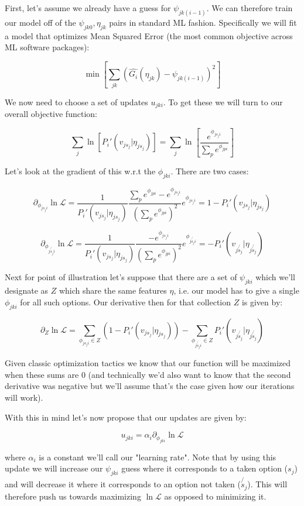 \documentclass[11pt]{article}
\begin{document}
First, let's assume we already have a guess for $\psi_{jk(i-1)}$. We can therefore train our model off of the $\psi_{jk0},\eta_{jk}$ pairs in standard ML fashion. Specifically we will fit a model that optimizes Mean Squared Error (the most common objective across ML software packages):

$$\min{\left[ \sum_{jk}\left(\hat{G_i}(\eta_{jk}) - \psi_{jk(i-1)}\right)^2 \right]}$$

We now need to choose a set of updates $u_{jki}$. To get these we will turn to our overall objective function:

$$\sum_j \ln{\left[ P_i'(v_{js_j} | \eta_{js_j}) \right]}= \sum_j \ln{\left[ \frac{e^{\phi_{js_ji}}}{\sum_p e^{\phi_{jpi}}} \right]}$$

Let's look at the gradient of this w.r.t the $\phi_{jki}$. There are two cases:

$$\partial_{\phi_{js_ji}}\ln{\mathcal{L}}
=
\frac{1}{P_i'(v_{js_j} | \eta_{js_j})}\frac{\sum_p e^{\phi_{jpi}}-e^{\phi_{js_ji}}}{\left( \sum_p e^{\phi_{jpi}} \right)^2} e^{\phi_{js_ji}}
=
1-P_i'(v_{js_j} | \eta_{js_j}) $$ 

$$\partial_{\phi_{j\not{s_j}i}}\ln{\mathcal{L}}
=
\frac{1}{P_i'(v_{js_j} | \eta_{js_j})}\frac{-e^{\phi_{js_ji}}}{\left( \sum_p e^{\phi_{jpi}} \right)^2} e^{\phi_{j\not{s_j}i}}
= 
-P_i'(v_{j\not{s_j}} | \eta_{j\not{s_j}})$$ 

Next for point of illustration let's suppose that there are a set of $\psi_{jki}$ which we'll designate as $Z$ which share the same features $\eta$, i.e. our model has to give a single $\phi_{jki}$ for all such options. Our derivative then for that collection $Z$ is given by:

$$\partial_Z \ln{\mathcal{L}}=\sum_{\phi_{js_ji} \in Z}\left(1-P_i'(v_{js_j} | \eta_{js_j}) \right)-\sum_{\phi_{j\not{s_j}i}\in Z}P_i'(v_{j\not{s_j}} | \eta_{j\not{s_j}})$$

Given classic optimization tactics we know that our function will be maximized when these sums are $0$ (and technically we'd also want to know that the second derivative was negative but we'll assume that's the case given how our iterations will work). \newline

With this in mind let's now propose that our updates are given by:

$$u_{jki} = \alpha_i \partial_{\phi_{jki}} \ln{\mathcal{L}} $$

where $\alpha_i$ is a constant we'll call our "learning rate". Note that by using this update we will increase our $\psi_{jki}$ guess where it corresponds to a taken option ($s_j$) and will decrease it where it corresponds to an option not taken ($\not{s_j}$). This will therefore push us towards maximizing $\ln{\mathcal{L}}$ as opposed to minimizing it. \newline
\end{document}

